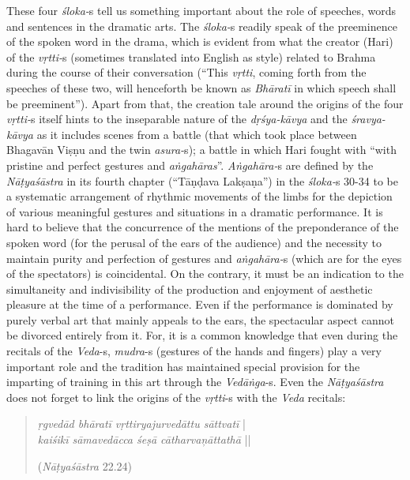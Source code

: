 These four \textsl{śloka-}s tell us something important about the role of speeches, words and sentences in the dramatic arts. The \textsl{śloka-}s readily speak of the preeminence of the spoken word in the drama, which is evident from what the creator (Hari) of the \textsl{vṛtti-}s (sometimes translated into English as style) related to Brahma during the course of their conversation (“This \textsl{vṛtti}, coming forth from the speeches of these two, will henceforth be known as \textsl{Bhāratī} in which speech shall be preeminent”). Apart from that, the creation tale around the origins of the four \textsl{vṛtti-}s itself hints to the inseparable nature of the \textsl{dṛśya-kāvya} and the \textsl{śravya-kāvya} as it includes scenes from a battle (that which took place between Bhagavān Viṣṇu and the twin \textsl{asura-}s); a battle in which Hari fought with “with pristine and perfect gestures and \textsl{aṅgahāras}”. \textsl{Aṅgahāra-}s are defined by the \textsl{Nāṭyaśāstra} in its fourth chapter (“Tāṇḍava Lakṣaṇa”) in the \textsl{śloka-}s 30-34 to be a systematic arrangement of rhythmic movements of the limbs for the depiction of various meaningful gestures and situations in a dramatic performance. It is hard to believe that the concurrence of the mentions of the preponderance of the spoken word (for the perusal of the ears of the audience) and the necessity to maintain purity and perfection of gestures and \textsl{aṅgahāra-}s (which are for the eyes of the spectators) is coincidental. On the contrary, it must be an indication to the simultaneity and indivisibility of the production and enjoyment of aesthetic pleasure at the time of a performance. Even if the performance is dominated by purely verbal art that mainly appeals to the ears, the spectacular aspect cannot be divorced entirely from it. For, it is a common knowledge that even during the recitals of the \textsl{Veda}-s, \textsl{mudra}-s (gestures of the hands and fingers) play a very important role and the tradition has maintained special provision for the imparting of training in this art through the \textsl{Vedāṅga}-s. Even the \textsl{Nāṭyaśāstra} does not forget to link the origins of the \textsl{vṛtti}-s with the \textsl{Veda} recitals: 
\begin{quote}
\textsl{ṛgvedād bhāratī vṛttiryajurvedāttu sāttvatī} |    \\
\textsl{kaiśikī sāmavedācca śeṣā cātharvaņāttathā} ||

\hfill(\textsl{Nāṭyaśāstra} 22.24)
\end{quote}

